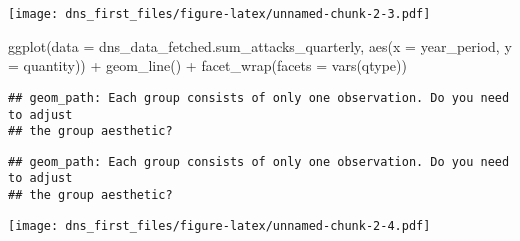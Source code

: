 \documentclass[
]{article}
\newenvironment{Shaded}{\begin{snugshade}}{\end{snugshade}}
\newcommand{\AttributeTok}[1]{\textcolor[rgb]{0.77,0.63,0.00}{#1}}
\newcommand{\FunctionTok}[1]{\textcolor[rgb]{0.00,0.00,0.00}{#1}}
\newcommand{\NormalTok}[1]{#1}
\newcommand{\SpecialCharTok}[1]{\textcolor[rgb]{0.00,0.00,0.00}{#1}}
\begin{document}
\texttt{[image: dns\_first\_files/figure-latex/unnamed-chunk-2-3.pdf]}

\begin{Shaded}
\begin{Highlighting}[]
\FunctionTok{ggplot}\NormalTok{(}\AttributeTok{data =}\NormalTok{ dns\_data\_fetched.sum\_attacks\_quarterly, }\FunctionTok{aes}\NormalTok{(}\AttributeTok{x =}\NormalTok{ year\_period, }\AttributeTok{y =}\NormalTok{ quantity)) }\SpecialCharTok{+}
    \FunctionTok{geom\_line}\NormalTok{() }\SpecialCharTok{+}
    \FunctionTok{facet\_wrap}\NormalTok{(}\AttributeTok{facets =} \FunctionTok{vars}\NormalTok{(qtype))}
\end{Highlighting}
\end{Shaded}

\begin{verbatim}
## geom_path: Each group consists of only one observation. Do you need to adjust
## the group aesthetic?
\end{verbatim}

\begin{verbatim}
## geom_path: Each group consists of only one observation. Do you need to adjust
## the group aesthetic?
\end{verbatim}

\texttt{[image: dns\_first\_files/figure-latex/unnamed-chunk-2-4.pdf]}
\end{document}
